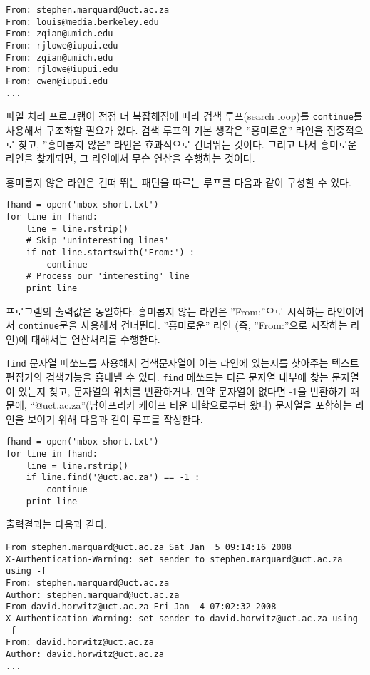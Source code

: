 \beforeverb
\begin{verbatim}
From: stephen.marquard@uct.ac.za
From: louis@media.berkeley.edu
From: zqian@umich.edu
From: rjlowe@iupui.edu
From: zqian@umich.edu
From: rjlowe@iupui.edu
From: cwen@iupui.edu
...
\end{verbatim}
\afterverb
%

파일 처리 프로그램이 점점 더 복잡해짐에 따라 검색 루프(search loop)를 {\tt continue}를 사용해서 구조화할 필요가 있다.
검색 루프의 기본 생각은 ''흥미로운'' 라인을 집중적으로 찾고, ''흥미롭지 않은'' 라인은 효과적으로 건너뛰는 것이다.
그리고 나서 흥미로운 라인을 찾게되면, 그 라인에서 무슨 연산을 수행하는 것이다.

흥미롭지 않은 라인은 건떠 뛰는 패턴을 따르는 루프를 다음과 같이 구성할 수 있다.

\beforeverb
\begin{verbatim}
fhand = open('mbox-short.txt')
for line in fhand:
    line = line.rstrip()
    # Skip 'uninteresting lines'
    if not line.startswith('From:') :
        continue
    # Process our 'interesting' line
    print line
\end{verbatim}
\afterverb
%

프로그램의 출력값은 동일하다. 흥미롭지 않는 라인은 ''From:''으로 시작하는 라인이어서 {\tt continue}문을 사용해서 건너뛴다.
''흥미로운'' 라인 (즉, ''From:''으로 시작하는 라인)에 대해서는 연산처리를 수행한다. 

{\tt find} 문자열 메쏘드를 사용해서 검색문자열이 어는 라인에 있는지를 찾아주는 텍스트 편집기의 검색기능을 흉내낼 수 있다.
{\tt find} 메쏘드는 다른 문자열 내부에 찾는 문자열이 있는지 찾고, 문자열의 위치를 반환하거나, 만약 문자열이 없다면 -1을 반환하기 때문에,
``@uct.ac.za''(남아프리카 케이프 타운 대학으로부터 왔다) 문자열을 포함하는 라인을 보이기 위해 다음과 같이 루프를 작성한다.

\beforeverb
\begin{verbatim}
fhand = open('mbox-short.txt')
for line in fhand:
    line = line.rstrip()
    if line.find('@uct.ac.za') == -1 : 
        continue
    print line
\end{verbatim}
\afterverb
%
출력결과는 다음과 같다.

\beforeverb
\begin{verbatim}
From stephen.marquard@uct.ac.za Sat Jan  5 09:14:16 2008
X-Authentication-Warning: set sender to stephen.marquard@uct.ac.za using -f
From: stephen.marquard@uct.ac.za
Author: stephen.marquard@uct.ac.za
From david.horwitz@uct.ac.za Fri Jan  4 07:02:32 2008
X-Authentication-Warning: set sender to david.horwitz@uct.ac.za using -f
From: david.horwitz@uct.ac.za
Author: david.horwitz@uct.ac.za
...
\end{verbatim}
\afterverb
%

